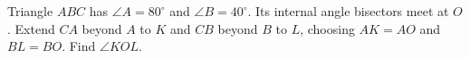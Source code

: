 Triangle $ABC$ has $\angle A=80^\circ$ and $\angle B=40^\circ$. Its internal angle bisectors meet at $O$. Extend $CA$ beyond $A$ to $K$ and $CB$ beyond $B$ to $L$, choosing $AK=AO$ and $BL=BO$. Find $\angle KOL$.
